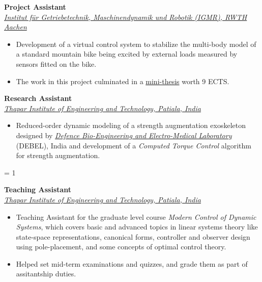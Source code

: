 \large{\textbf{Project Assistant}}
\hfill
\minithesisdate\\
\href{https://www.igmr.rwth-aachen.de/cms/~jkhpl/igmr/}{\large{\emph{Institut für Getriebetechnik, Maschinendynamik und Robotik (IGMR), RWTH Aachen}}}
\begin{itemize}
\item \large{Development of a virtual control system to stabilize the multi-body model of a standard mountain bike being excited by external loads measured by sensors fitted on the bike. }
\item\large{The work in this project culminated in a \href{https://github.com/average-engineer/MiniThesis_IGMR/blob/master/Thesis.pdf}{\large{mini-thesis}} worth 9 ECTS.}
\end{itemize}

\vspace{0.1 in}

\large{\textbf{Research Assistant}}
\hfill
\drdodate\\
\href{https://www.thapar.edu/}{\large{\emph{Thapar Institute of Engineering and Technology, Patiala, India}}}
\begin{itemize}
\item\large{Reduced-order dynamic modeling of a strength augmentation exoskeleton designed by \href{https://www.drdo.gov.in/drdo/labs-and-establishments/defence-bio-engineering-electro-medical-laboratory-debel}{\large{\emph{Defence Bio-Engineering and Electro-Medical Laboratory}}} (DEBEL), India and development of a \emph{Computed Torque Control} algorithm for strength augmentation.}
\end{itemize}

\ifnum\teach = 1
	\vspace{0.1 in}
	
	\large{\textbf{Teaching Assistant}}
	\hfill
	\thapardate\\
	\href{https://www.thapar.edu/}{\large{\emph{Thapar Institute of Engineering and Technology, Patiala, India}}}
	\begin{itemize}
		\item Teaching Assistant for the graduate level course \emph{Modern Control of Dynamic Systems}, which covers basic and advanced topics in linear systems theory like state-space representations, canonical forms, controller and observer design using pole-placement, and some concepts of optimal control theory.
		\item Helped set mid-term examinations and quizzes, and grade them as part of assitantship duties.
	\end{itemize}
\fi




